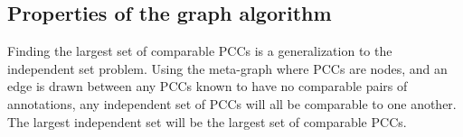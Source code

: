 \begin{appendices}
\begin{comment}
\chapter{Sight-resight analysis with incomparability}\label{app:markrecapincomp}

Given a completed decision graph, each PCC corresponds to an individual, and each pair of PCCs is either known to
  be different or known to be incomparable.
If all PCCs are known to be different, then sight-resight analysis is simple.
Each PCC can be grouped into a set of encounters.
The chronologically first encounter is a sighting, and the subsequent encounters are re-sightings.
However, if it cannot be determined that some pairs of PCCs are different, we must use only the first or second
  of these PCCs in our analysis, and the other must be discarded.

Finding the largest set of PCCs that can be used in sight-resight statistics, we must find the largest set of
  PCCs that are all comparable to each other.
This problem can be solved in the following steps:
\begin{enumln}
\item Find all pairs of PCCs that are incomparable.
\item Consider the meta-graph where each of these incomparable PCCs is a node and there is an edge between each
  pair.
\item Find the largest independent set in this meta-graph (note the is NP-hard).
\item Remove all nodes from the decision graph corresponding to the PCCs in the meta-graph that were not in the
  independent set.
\end{enumln}
Now, in the original graph there is no PCC that is incomparable with any other, otherwise there would have been
  two nodes in the independent set that had an edge between them, which is a contradiction.
Even though finding the largest independent set would use the most data, any independent set will do.
Thus, sight-resight statistics can now be performed on this graph.
\end{comment}


\chapter{Properties of the graph algorithm}\label{app:graphprop}


\begin{enumln}

\item Finding the largest set of comparable PCCs is a generalization to the independent set problem.
Using the meta-graph where PCCs are nodes, and an edge is drawn between any PCCs known to have no comparable
  pairs of annotations, any independent set of PCCs will all be comparable to one another.
The largest independent set will be the largest set of comparable PCCs.


\end{enumln}
\end{appendices}
